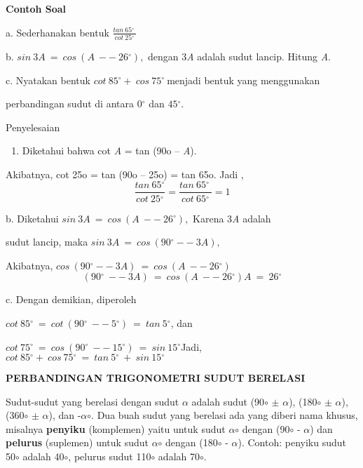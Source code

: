 \documentclass[11pt,fleqn]{book} %
\begin{document}
\begin{myEnumerate}
\begin{itemize}
\noindent \textbf{Contoh Soal }

\noindent a. Sederhanakan bentuk $\frac{tan\ 65{}^\circ \ }{cot\ 25{}^\circ }\ $

\noindent b. $sin\ 3A\ =\ cos\ (A\ --\ 26{}^\circ ),$ dengan 3\textit{A }adalah sudut lancip. Hitung \textit{A}.

\noindent c. Nyatakan bentuk $cot\ 85{}^\circ +\ cos\ 75{}^\circ \ $menjadi bentuk yang menggunakan

\noindent perbandingan sudut di antara $0{}^\circ $ dan $45{}^\circ $.

\noindent Penyelesaian

\begin{enumerate}
\item  Diketahui bahwa cot \textit{A }= tan (90o -- \textit{A}).
\end{enumerate}

\noindent Akibatnya, cot 25o = tan (90o -- 25o) = tan 65o. Jadi ,
\[\frac{tan\ 65{}^\circ }{cot\ 25{}^\circ }=\frac{tan\ 65{}^\circ \ }{cot\ 65{}^\circ }=1\] 


\noindent b. Diketahui $sin\ 3A\ =\ cos\ (A\ --\ 26{}^\circ ),$ Karena 3\textit{A }adalah

\noindent sudut lancip, maka $sin\ 3A\ =\ cos\ (90{}^\circ --\ 3A),$

\noindent Akibatnya, $cos\ (90{}^\circ --\ 3A)\ =\ cos\ (A\ --\ 26{}^\circ )$
\[(90{}^\circ \ --\ 3A)\ =\ cos\ (A\ --\ 26{}^\circ )A\ =\ 26{}^\circ \] 


\noindent c. Dengan demikian, diperoleh

\noindent $cot\ 85{}^\circ \ =\ cot\ (90{}^\circ \ --\ 5{}^\circ )\ =\ tan\ 5{}^\circ $, dan

\noindent $cot\ 75{}^\circ \ =\ cos\ (90{}^\circ \ --\ 15{}^\circ )\ =\ sin\ 15{}^\circ $Jadi, $cot\ 85{}^\circ +\ cos\ 75{}^\circ \ =\ tan\ 5{}^\circ \ +\ sin\ 15{}^\circ $

\noindent 

\noindent 

\noindent \textbf{PERBANDINGAN TRIGONOMETRI  SUDUT BERELASI}

\noindent Sudut-sudut yang berelasi dengan sudut $\alpha$ adalah sudut (90$\circ$ $\pm$ $\alpha$), (180$\circ$ $\pm$ $\alpha$), (360$\circ$ $\pm$ $\alpha$), dan -$\alpha$$\circ$. Dua buah sudut yang berelasi ada yang diberi nama khusus, misalnya \textbf{penyiku} (komplemen) yaitu untuk sudut $\alpha$$\circ$ dengan (90$\circ$ - $\alpha$) dan \textbf{pelurus }(suplemen) untuk sudut $\alpha$$\circ$ dengan (180$\circ$ - $\alpha$). Contoh: penyiku sudut  50$\circ$ adalah 40$\circ$, pelurus sudut 110$\circ$ adalah 70$\circ$.


\end{itemize}
\end{myEnumerate}
\end{document}
